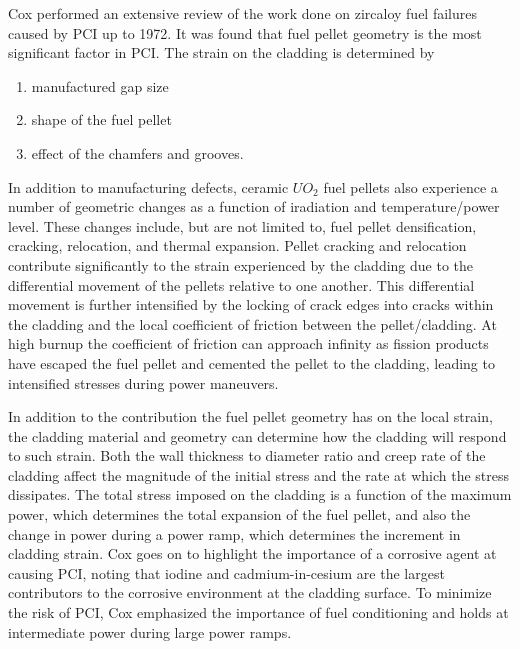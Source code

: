 \documentclass[edeposit,fullpage,11pt]{uiucthesis2009}
\begin{document}
Cox \cite{cox_pellet-clad_1990} performed an extensive review of the work done on zircaloy fuel failures caused by \gls{PCI} up to 1972.
It was found that fuel pellet geometry is the most significant factor in \gls{PCI}.
The strain on the cladding is determined by
\begin{enumerate}
\item manufactured gap size
\item shape of the fuel pellet
\item effect of the chamfers and grooves.
\end{enumerate} 
In addition to manufacturing defects, ceramic $UO_2$ fuel pellets also experience a number of geometric changes as a function of iradiation and temperature/power level.
These changes include, but are not limited to, fuel pellet  densification, cracking, relocation, and thermal expansion. 
Pellet cracking and relocation contribute significantly to the strain experienced by the cladding due to the differential movement of the pellets relative to one another.
This differential movement is further intensified  by the locking of crack edges into cracks within the cladding and the local coefficient of friction between the pellet/cladding.
At high burnup the coefficient of friction can approach infinity as fission products have escaped the fuel pellet and cemented the pellet to the cladding, leading to intensified stresses during power maneuvers. 

In addition to the contribution the fuel pellet geometry has on the local strain, the cladding material and geometry can determine how the cladding will respond to such strain.
Both the wall thickness to diameter ratio and creep rate of the cladding affect the magnitude of the initial stress and the rate at which the stress dissipates.
The total stress imposed on the cladding is a function of the maximum power, which determines the total expansion of the fuel pellet, and also the change in power during a power ramp, which determines the increment in cladding strain.
Cox goes on to highlight the importance of a corrosive agent at causing \gls{PCI}, noting that iodine and cadmium-in-cesium are the largest contributors to the corrosive environment at the cladding surface.
To minimize the risk of \gls{PCI}, Cox emphasized the importance of fuel conditioning and holds at intermediate power during large power ramps.
\end{document}
